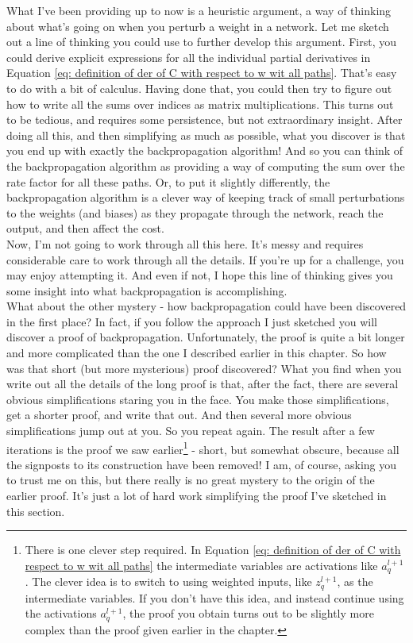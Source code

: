 What I've been providing up to now is a heuristic argument, a way of thinking about what's going on when you perturb a weight in a network. Let me sketch out a line of thinking you could use to further develop this argument. First, you could derive explicit expressions for all the individual partial derivatives in Equation \ref{eq: definition of der of C with respect to w wit all paths}. That's easy to do with a bit of calculus. Having done that, you could then try to figure out how to write all the sums over indices as matrix multiplications. This turns out to be tedious, and requires some persistence, but not extraordinary insight. After doing all this, and then simplifying as much as possible, what you discover is that you end up with exactly the backpropagation algorithm! And so you can think of the backpropagation algorithm as providing a way of computing the sum over the rate factor for all these paths. Or, to put it slightly differently, the backpropagation algorithm is a clever way of keeping track of small perturbations to the weights (and biases) as they propagate through the network, reach the output, and then affect the cost.\\

Now, I'm not going to work through all this here. It's messy and requires considerable care to work through all the details. If you're up for a challenge, you may enjoy attempting it. And even if not, I hope this line of thinking gives you some insight into what backpropagation is accomplishing.\\

What about the other mystery - how backpropagation could have been discovered in the first place? In fact, if you follow the approach I just sketched you will discover a proof of backpropagation. Unfortunately, the proof is quite a bit longer and more complicated than the one I described earlier in this chapter. So how was that short (but more mysterious) proof discovered? What you find when you write out all the details of the long proof is that, after the fact, there are several obvious simplifications staring you in the face. You make those simplifications, get a shorter proof, and write that out. And then several more obvious simplifications jump out at you. So you repeat again. The result after a few iterations is the proof we saw earlier\footnote{There is one clever step required. In Equation \ref{eq: definition of der of C with respect to w wit all paths} the intermediate variables are activations like $a^{l+1}_q$. The clever idea is to switch to using weighted inputs, like $z^{l+1}_q$, as the intermediate variables. If you don't have this idea, and instead continue using the activations $a^{l+1}_q$, the proof you obtain turns out to be slightly more complex than the proof given earlier in the chapter.} - short, but somewhat obscure, because all the signposts to its construction have been removed! I am, of course, asking you to trust me on this, but there really is no great mystery to the origin of the earlier proof. It's just a lot of hard work simplifying the proof I've sketched in this section.

\newpage